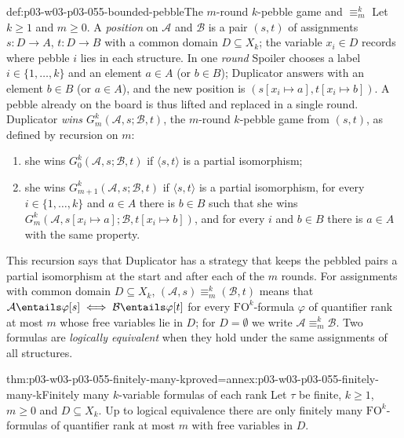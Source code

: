 \begin{hbdefinition}{def:p03-w03-p03-055-bounded-pebble}{The \(m\)-round \(k\)-pebble game and \(\equiv^k_m\)}
Let \(k\ge1\) and \(m\ge0\). A \emph{position} on \(\mathcal A\) and
\(\mathcal B\) is a pair \((s,t)\) of assignments \(s\colon D\to A\),
\(t\colon D\to B\) with a common domain \(D\subseteq X_k\); the variable
\(x_i\in D\) records where pebble \(i\) lies in each structure. In one
\emph{round} Spoiler chooses a label \(i\in\{1,\ldots,k\}\) and an element
\(a\in A\) (or \(b\in B\)); Duplicator answers with an element \(b\in B\)
(or \(a\in A\)), and the new position is
\((s[x_i\mapsto a],t[x_i\mapsto b])\). A pebble already on the board is
thus lifted and replaced in a single round. Duplicator \emph{wins
\(G^k_m(\mathcal A,s;\mathcal B,t)\)}, the \(m\)-round \(k\)-pebble game
from \((s,t)\), as defined by recursion on \(m\):
\begin{enumerate}
\item she wins \(G^k_0(\mathcal A,s;\mathcal B,t)\) if
      \(\langle s,t\rangle\) is a partial isomorphism;
\item she wins \(G^k_{m+1}(\mathcal A,s;\mathcal B,t)\) if
      \(\langle s,t\rangle\) is a partial isomorphism, for every
      \(i\in\{1,\ldots,k\}\) and \(a\in A\) there is \(b\in B\) such that
      she wins \(G^k_m(\mathcal A,s[x_i\mapsto a];\mathcal B,t[x_i\mapsto b])\),
      and for every \(i\) and \(b\in B\) there is \(a\in A\) with the same
      property.
\end{enumerate}
This recursion says that Duplicator has a strategy that keeps the pebbled
pairs a partial isomorphism at the start and after each of the \(m\)
rounds. For assignments with common domain \(D\subseteq X_k\),
\((\mathcal A,s)\equiv^k_m(\mathcal B,t)\) means that
\(\mathcal A\entails\varphi[s]\iff\mathcal B\entails\varphi[t]\) for every
\(\mathrm{FO}^k\)-formula \(\varphi\) of quantifier rank at most \(m\) whose
free variables lie in \(D\); for \(D=\emptyset\) we write
\(\mathcal A\equiv^k_m\mathcal B\). Two formulas are \emph{logically
equivalent} when they hold under the same assignments of all structures.
\end{hbdefinition}

\begin{hblemma}{thm:p03-w03-p03-055-finitely-many-k}{proved=annex:p03-w03-p03-055-finitely-many-k}{Finitely many \(k\)-variable formulas of each rank}
Let \(\tau\) be finite, \(k\ge1\), \(m\ge0\) and \(D\subseteq X_k\). Up to
logical equivalence there are only finitely many \(\mathrm{FO}^k\)-formulas
of quantifier rank at most \(m\) with free variables in \(D\).
\end{hblemma}

